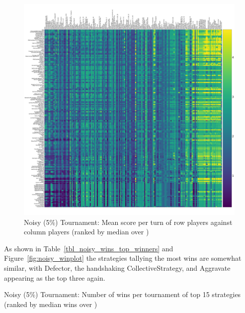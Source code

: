 \documentclass{article}
\begin{document}
\begin{figure}[!hbtp]
    \centering
    \includegraphics[width=\textwidth]{./assets/noisy_scores_heatmap.pdf}
    \caption{Noisy (5\%) Tournament: Mean score per turn of row players against
    column players (ranked by median over
        \protecttournaments)}
    \label{fig:noisy_heatmap}
\end{figure}

As shown in Table~\ref{tbl_noisy_wins_top_winners} and
Figure~\ref{fig:noisy_winplot} the strategies tallying the most wins are
somewhat similar, with Defector, the handshaking CollectiveStrategy, and
Aggravate appearing as the top three again.

\begin{table}[!hbtp]
    \centering
        
        \caption{Noisy (5\%) Tournament: Number of wins per tournament
        of top 15 strategies (ranked by median wins over
        \protecttournaments)}
        \label{tbl:noisy_wins_top_winners}
\end{table}
\end{document}
